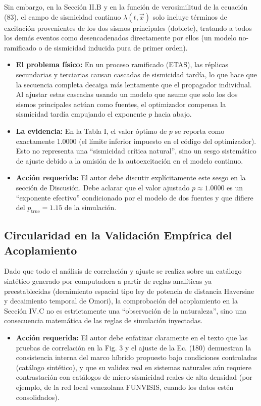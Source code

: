 \documentclass[11pt]{article}
\begin{document}
Sin embargo, en la Sección II.B y en la función de verosimilitud de la ecuación (83), el campo de sismicidad continuo $\lambda(t, \vec{x})$ solo incluye términos de excitación provenientes de los dos sismos principales (doblete), tratando a todos los demás eventos como desencadenados directamente por ellos (un modelo no-ramificado o de sismicidad inducida pura de primer orden).
\begin{itemize}
    \item \textbf{El problema físico:} En un proceso ramificado (ETAS), las réplicas secundarias y terciarias causan cascadas de sismicidad tardía, lo que hace que la secuencia completa decaiga más lentamente que el propagador individual. Al ajustar estas cascadas usando un modelo que asume que solo los dos sismos principales actúan como fuentes, el optimizador compensa la sismicidad tardía empujando el exponente $p$ hacia abajo.
    \item \textbf{La evidencia:} En la Tabla I, el valor óptimo de $p$ se reporta como exactamente $1.0000$ (el límite inferior impuesto en el código del optimizador). Esto no representa una ``sismicidad crítica natural'', sino un sesgo sistemático de ajuste debido a la omisión de la autoexcitación en el modelo continuo.
    \item \textbf{Acción requerida:} El autor debe discutir explícitamente este sesgo en la sección de Discusión. Debe aclarar que el valor ajustado $p \approx 1.0000$ es un ``exponente efectivo'' condicionado por el modelo de dos fuentes y que difiere del $p_{\text{true}} = 1.15$ de la simulación.
\end{itemize}

\subsection{Circularidad en la Validación Empírica del Acoplamiento}
Dado que todo el análisis de correlación y ajuste se realiza sobre un catálogo sintético generado por computadora a partir de reglas analíticas ya preestablecidas (decaimiento espacial tipo ley de potencia de distancia Haversine y decaimiento temporal de Omori), la comprobación del acoplamiento en la Sección IV.C no es estrictamente una ``observación de la naturaleza'', sino una consecuencia matemática de las reglas de simulación inyectadas.
\begin{itemize}
    \item \textbf{Acción requerida:} El autor debe enfatizar claramente en el texto que las pruebas de correlación en la Fig. 3 y el ajuste de la Ec. (180) demuestran la consistencia interna del marco híbrido propuesto bajo condiciones controladas (catálogo sintético), y que su validez real en sistemas naturales aún requiere contrastación con catálogos de micro-sismicidad reales de alta densidad (por ejemplo, de la red local venezolana FUNVISIS, cuando los datos estén consolidados).
\end{itemize}
\end{document}
